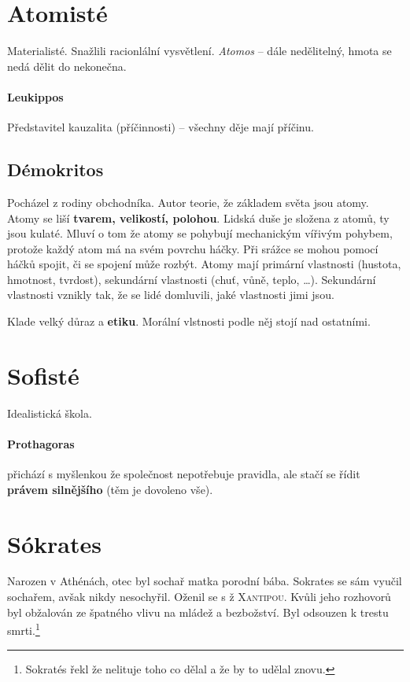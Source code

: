 \documentclass[10pt,a4paper,
twoside,%
]{report}
\begin{document}
\section{Atomisté}
Materialisté. Snažlili racionlální vysvětlení. \emph{Atomos} -- dále nedělitelný, hmota se nedá dělit do nekonečna.

\paragraph{Leukippos}
Představitel kauzalita (příčinnosti) -- všechny děje mají příčinu.

\subsection{Démokritos} Pocházel z rodiny obchodníka. Autor teorie, že základem světa jsou atomy. Atomy se liší \textbf{tvarem,
 velikostí,
 polohou}.
Lidská duše je složena z atomů, ty jsou kulaté. Mluví o tom že atomy se pohybují mechanickým vířivým pohybem, protože každý atom má na svém povrchu háčky. Při srážce se mohou pomocí háčků spojit, či se spojení může rozbýt. Atomy mají primární vlastnosti (hustota, hmotnost, tvrdost), sekundární vlastnosti (chuť, vůně, teplo, \dots). Sekundární vlastnosti vznikly tak, že se lidé domluvili, jaké vlastnosti jimi jsou.

Klade velký důraz a \textbf{etiku}. Morální vlstnosti podle něj stojí nad ostatními.

\section{Sofisté}

Idealistická škola.

 \paragraph{Prothagoras} přichází s myšlenkou že společnost nepotřebuje pravidla, ale stačí se řídit \textbf{právem silnějšího} (těm je dovoleno vše).
 
\section{Sókrates}
Narozen v Athénách, otec byl sochař matka porodní bába. Sokrates se sám vyučil sochařem, avšak nikdy nesochyřil. Oženil se s ž \textsc{Xantipou}. Kvůli jeho rozhovorů byl obžalován ze špatného vlivu na mládež a bezbožství. Byl odsouzen k trestu smrti.\footnote{Sokratés řekl že nelituje toho co dělal a že by to udělal znovu.} 
\end{document}
